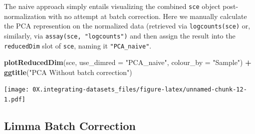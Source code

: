 \documentclass[]{book}
\newenvironment{Shaded}{\begin{snugshade}}{\end{snugshade}}
\newcommand{\CommentTok}[1]{\textcolor[rgb]{0.56,0.35,0.01}{\textit{#1}}}
\newcommand{\DataTypeTok}[1]{\textcolor[rgb]{0.13,0.29,0.53}{#1}}
\newcommand{\DecValTok}[1]{\textcolor[rgb]{0.00,0.00,0.81}{#1}}
\newcommand{\KeywordTok}[1]{\textcolor[rgb]{0.13,0.29,0.53}{\textbf{#1}}}
\newcommand{\NormalTok}[1]{#1}
\newcommand{\OperatorTok}[1]{\textcolor[rgb]{0.81,0.36,0.00}{\textbf{#1}}}
\newcommand{\StringTok}[1]{\textcolor[rgb]{0.31,0.60,0.02}{#1}}
\begin{document}
The naive approach simply entails visualizing the combined \texttt{sce} object post-normalization with no attempt at batch correction. Here we manually calculate the PCA represention on the normalized data (retrieved via \texttt{logcounts(sce)} or, similarly, via \texttt{assay(sce,\ "logcounts")} and then assign the result into the \texttt{reducedDim} slot of \texttt{sce}, naming it \texttt{"PCA\_naive"}.

\begin{Shaded}
\end{Shaded}

\begin{Shaded}
\begin{Highlighting}[]
\KeywordTok{plotReducedDim}\NormalTok{(sce, }\DataTypeTok{use_dimred =} \StringTok{"PCA_naive"}\NormalTok{,}
               \DataTypeTok{colour_by =} \StringTok{"Sample"}\NormalTok{) }\OperatorTok{+}\StringTok{ }
\StringTok{    }\KeywordTok{ggtitle}\NormalTok{(}\StringTok{"PCA Without batch correction"}\NormalTok{)}
\end{Highlighting}
\end{Shaded}

\texttt{[image: 0X.integrating-datasets\_files/figure-latex/unnamed-chunk-12-1.pdf]}

\hypertarget{limma-batch-correction}{%
\subsection{Limma Batch Correction}\label{limma-batch-correction}}
\end{document}
